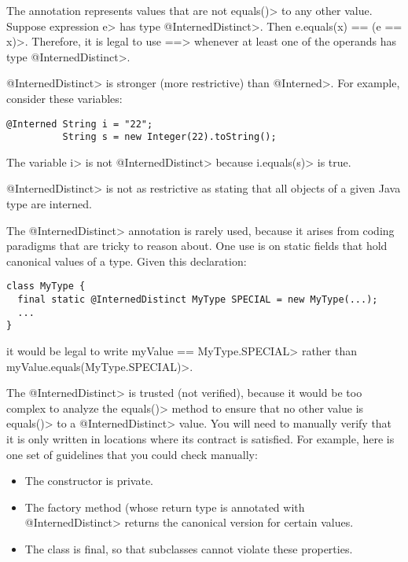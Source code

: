 The  annotation
represents values that are not \<equals()> to any other value.  Suppose
expression \<e> has type \<@InternedDistinct>.  Then \<e.equals(x) == (e ==
x)>.  Therefore, it is legal to use \<==> whenever at least one of the
operands has type \<@InternedDistinct>.

\<@InternedDistinct> is stronger (more restrictive) than \<@Interned>.
For example, consider these variables:

\begin{Verbatim}
@Interned String i = "22";
          String s = new Integer(22).toString();
\end{Verbatim}

\noindent
The variable \<i> is not \<@InternedDistinct> because \<i.equals(s)> is true.

\<@InternedDistinct> is not as restrictive as stating that all objects of a
given Java type are interned.

The \<@InternedDistinct> annotation is rarely used, because it arises from
coding paradigms that are tricky to reason about.
%
One use is on static fields
that hold canonical values of a type.
Given this declaration:

\begin{Verbatim}
class MyType {
  final static @InternedDistinct MyType SPECIAL = new MyType(...);
  ...
}
\end{Verbatim}

\noindent
it would be legal to write \<myValue == MyType.SPECIAL> rather than
\<myValue.equals(MyType.SPECIAL)>.

The \<@InternedDistinct> is trusted (not verified), because it would be too
complex to analyze the \<equals()> method to ensure that no other value is
\<equals()> to a \<@InternedDistinct> value.  You will need to manually
verify that it is only written in locations where its contract is satisfied.
For example, here is one set of guidelines that you could check manually:
\begin{itemize}
\item The constructor is private.
\item The factory method (whose return type is annotated with
  \<@InternedDistinct> returns the canonical version for certain values.
\item The class is final, so that subclasses cannot violate these properties.
\end{itemize}



